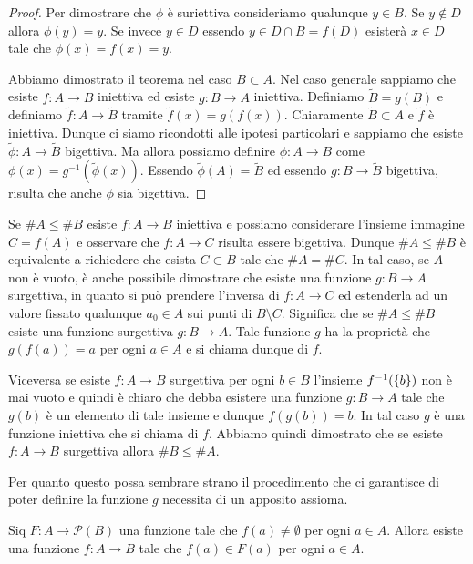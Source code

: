 \begin{proof}
Per dimostrare che $\phi$ è suriettiva consideriamo qualunque $y \in B$.
Se $y\not \in D$ allora $\phi(y)=y$.
Se invece $y\in D$ essendo $y\in D\cap B = f(D)$ esisterà $x\in D$ tale
che $\phi(x) = f(x) = y$.

Abbiamo dimostrato il teorema nel caso $B\subset A$.
Nel caso generale sappiamo che esiste $f\colon A\to B$ iniettiva
ed esiste $g\colon B\to A$ iniettiva. Definiamo $\tilde B=g(B)$ e
definiamo $\tilde f\colon A\to \tilde B$ tramite $\tilde f(x) = g(f(x))$.
Chiaramente $\tilde B\subset A$ e $\tilde f$ è iniettiva.
Dunque ci siamo ricondotti alle ipotesi particolari e sappiamo che esiste
$\tilde \phi \colon A \to \tilde B$ bigettiva. Ma allora possiamo definire
$\phi\colon A\to B$ come $\phi(x) = g^{-1}(\tilde \phi(x))$.
Essendo $\tilde \phi(A)=\tilde B$ ed essendo $g\colon B\to \tilde B$
bigettiva, risulta che anche $\phi$ sia bigettiva.
\end{proof}

Se $\# A \le \# B$ esiste $f\colon A\to B$ iniettiva e possiamo considerare l'insieme 
immagine $C=f(A)$ e osservare che $f\colon A \to C$ risulta 
essere bigettiva. 
Dunque $\#A \le \#B$ è equivalente a richiedere 
che esista $C\subset B$ tale che $\#A = \#C$.
In tal caso, se $A$ non è vuoto, è anche possibile dimostrare 
che esiste una funzione $g\colon B\to A$ surgettiva, in quanto 
si può prendere l'inversa di $f\colon A \to C$ ed estenderla 
ad un valore fissato qualunque $a_0\in A$ sui punti di $B\setminus C$.
Significa che se $\#A\le \#B$ esiste una funzione surgettiva 
$g \colon B\to A$. Tale funzione $g$ ha la proprietà che 
$g(f(a))=a$ per ogni $a\in A$ e si chiama dunque 
 di $f$.

Viceversa se esiste $f\colon A\to B$ surgettiva 
per ogni $b\in B$ l'insieme $f^{-1}({\left\{ b \right\}})$ non è mai 
vuoto e quindi è chiaro che debba esistere 
una funzione $g\colon B\to A$ tale che $g(b)$ è un elemento 
di tale insieme e dunque $f(g(b)) = b$. 
In tal caso $g$ è una funzione iniettiva che 
si chiama  di $f$.
Abbiamo quindi dimostrato che se esiste $f\colon A\to B$
surgettiva allora $\#B \le \#A$.

Per quanto questo possa sembrare strano
il procedimento che ci garantisce di poter 
definire la funzione $g$ necessita di un apposito  
assioma.

\begin{axiom}%
  \label{axiom:AC}%
  Siq $F\colon A \to \mathcal P(B)$
  una funzione tale che $f(a)\neq \emptyset$ 
  per ogni $a\in A$. Allora esiste una funzione
  $f\colon A \to B$ tale che $f(a)\in F(a)$
  per ogni $a\in A$.
\end{axiom}
  
